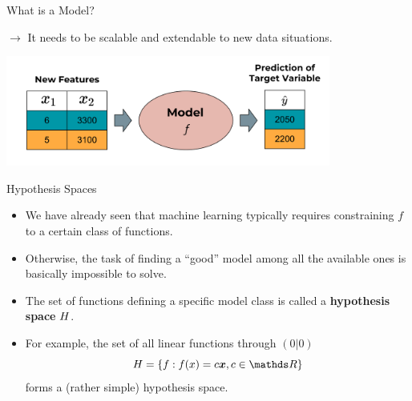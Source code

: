 \documentclass[11pt,compress,t,notes=noshow, xcolor=table]{beamer}
\begin{document}
\begin{vbframe}{What is a Model?}
\begin{itemize}
  $\rightarrow$ It needs to be scalable and extendable to new data situations.

  \begin{center}
    \includegraphics[width = 0.8\textwidth]{figure_man/the_model_web} 
  \end{center}

\end{itemize}

\end{vbframe}


\begin{vbframe}{Hypothesis Spaces}

\begin{itemize}

  \item We have already seen that machine learning typically requires 
  constraining $f$ to a certain class of functions.
  
  \item Otherwise, the task of finding a \enquote{good} model among all the
  available ones is basically impossible to solve.
  
  \item The set of functions defining a specific model class is called a 
  \textbf{hypothesis space} $H$.
  
  \item For example, the set of all linear functions through $(0|0)$
  $$\Hspace = \{f: \fx = c \xv, c \in \R\}$$
  forms a (rather simple) hypothesis space.

\end{itemize}  

\end{vbframe}

\end{document}
